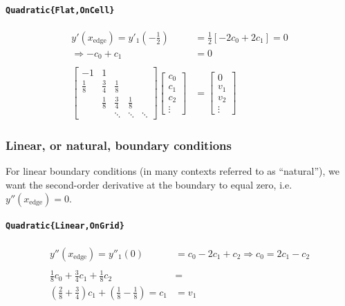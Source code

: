 \documentclass{article}
\begin{document}
\paragraph{\texttt{Quadratic\{Flat,OnCell\}}}
\begin{align*}
y'(x_{\text{edge}}) = y'_1\left(-\frac{1}{2}\right) &= \frac{1}{2}\left[-2c_0 + 2c_1\right] = 0\\
\Rightarrow -c_0 + c_1 &= 0
\\
\\
\begin{bmatrix} 
-1 & 1 \\
\frac{1}{8} & \frac{3}{4} & \frac{1}{8} \\
 & \frac{1}{8} & \frac{3}{4} & \frac{1}{8} \\
 & & \ddots & \ddots & \ddots
\end{bmatrix}
\begin{bmatrix}c_0\\ c_1\\ c_2\\\vdots\end{bmatrix}
&=
\begin{bmatrix}0\\ v_1 \\ v_2 \\\vdots\end{bmatrix}
\end{align*}

\subsubsection{Linear, or natural, boundary conditions}

For linear boundary conditions (in many contexts referred to as ``natural''), we want the second-order derivative at the boundary to equal zero, i.e. $y''(x_{\text{edge}}) = 0$.

\paragraph{\texttt{Quadratic\{Linear,OnGrid\}}}
\begin{align*}
y''(x_{\text{edge}}) = y''_1(0) &= c_0 - 2 c_1 + c_2 \Rightarrow c_0 = 2 c_1 - c_2 \\
\\
\frac{1}{8}c_0 + \frac{3}{4} c_1 + \frac{1}{8} c_2 &= \\
\left(\frac{2}{8}+\frac{3}{4}\right)c_1 + \left(\frac{1}{8}-\frac{1}{8}\right) = c_1 &= v_1
\end{align*}
\end{document}
